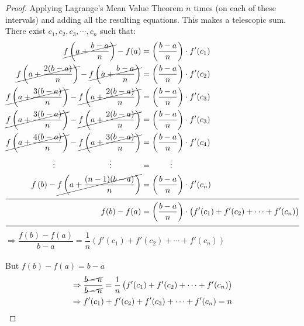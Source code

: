 \documentclass[14]{article}
\theoremstyle{definition}
\theoremstyle{case}
\begin{document}
\begin{proof}
Applying Lagrange's Mean Value Theorem $n$ times (on each of these intervals) and adding all the resulting equations. This makes a telescopic sum. There exist $c_1, c_2, c_3, \cdots, c_n$ such that:
\begin{align*}
\cancel{f\left(a + \dfrac{b - a}{n}\right)} - f(a) &= \left(\dfrac{b - a}{n}\right) \cdot f'(c_1)\\
\cancel{f\left(a + \dfrac{2(b - a)}{n}\right)} - \cancel{f\left(a + \dfrac{b - a}{n}\right)} &= \left(\dfrac{b - a}{n}\right) \cdot f'(c_2)\\
\cancel{f\left(a + \dfrac{3(b - a)}{n}\right)} - \cancel{f\left(a + \dfrac{2(b - a)}{n}\right)} &= \left(\dfrac{b - a}{n}\right) \cdot f'(c_3)\\
\cancel{f\left(a + \dfrac{3(b - a)}{n}\right)} - \cancel{f\left(a + \dfrac{2(b - a)}{n}\right)} &= \left(\dfrac{b - a}{n}\right) \cdot f'(c_3)\\
\cancel{f\left(a + \dfrac{4(b - a)}{n}\right)} - \cancel{f\left(a + \dfrac{3(b - a)}{n}\right)} &= \left(\dfrac{b - a}{n}\right) \cdot f'(c_4)\\
\vdots\;\;\;\;\;\;\;\;\;\;\;\;\;\;\;\;\;\;\;\;\;\;\;\;\vdots\;\;\;\;\;\;\;\;\;\;\;\;\;&= \;\;\;\;\;\;\;\;\vdots\\
f\left(b \right) - \cancel{f\left(a + \dfrac{(n-1)(b - a)}{n}\right)} &= \left(\dfrac{b - a}{n}\right) \cdot f'(c_n)\\
\cline{0-1}
f(b) - f(a) &= \left(\dfrac{b-a}{n}\right)\cdot \left(f'(c_1) + f'(c_2) + \cdots + f'(c_n)\right)\\
\cline{0-1}
\end{align*}
$\Rightarrow \dfrac{f(b) - f(a)}{b - a} =\dfrac1{n} \left(f'(c_1) + f'(c_2) + \cdots + f'(c_n)\right)$\\\\
But $f(b) - f(a) = b - a$
\begin{align*}
\Rightarrow \dfrac{\cancel{b - a}}{\cancel{b - a}} =\dfrac1{n} \left(f'(c_1) + f'(c_2) + \cdots + f'(c_n)\right)\\
\Rightarrow f'(c_1) + f'(c_2) + f'(c_3) + \cdots + f'(c_n) = n
\end{align*}
\end{proof}
\pagebreak
\end{document}
